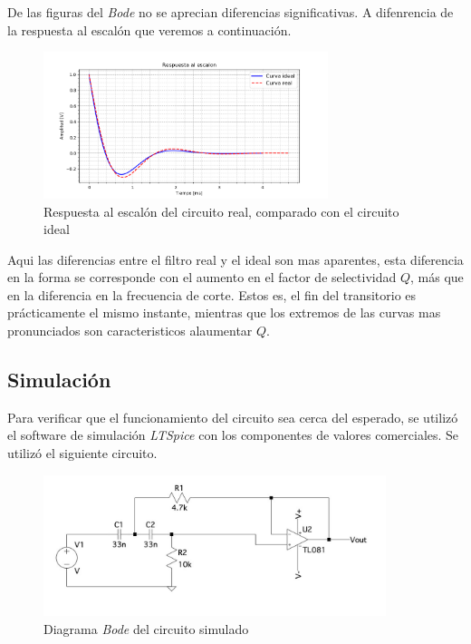 De las figuras del \textit{Bode} no se aprecian diferencias significativas. A difenrencia de la respuesta al escal\'on que veremos a continuaci\'on.

\begin{figure}[hbt]
	\centering
	\includegraphics[width=8.3cm]{imagenes/StepReal}
	\caption{Respuesta al escal\'on del circuito real, comparado con el circuito ideal}	
\end{figure}
Aqui las diferencias entre el filtro real y el ideal son mas aparentes, esta diferencia en la forma se corresponde con el aumento en el factor de selectividad $Q$, m\'as que en la diferencia en la frecuencia de corte. Estos es, el fin del transitorio es pr\'acticamente el mismo instante, mientras que los extremos de las curvas mas pronunciados son caracteristicos alaumentar $Q$.
 


\subsection*{Simulaci\'on}
	Para verificar que el funcionamiento del circuito sea cerca del esperado, se utiliz\'o el software de simulaci\'on \textit{LTSpice} con los componentes de valores comerciales. Se utiliz\'o el siguiente circuito.\\
	
		
\begin{figure}[hbt]
	\centering
	\includegraphics[width=10cm]{imagenes/Simulacion}
	\caption{Diagrama \textit{Bode} del circuito simulado}
\end{figure}
	
